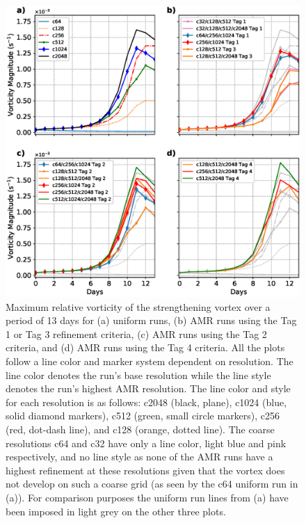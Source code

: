 \begin{figure}
   \centerline{%
   \noindent
   \includegraphics[width=\textwidth]{Chap2/vortmax_lineplot.eps}}
   \caption{Maximum relative vorticity of the strengthening vortex over a 
   period of 13 days for (a) uniform runs, (b) AMR runs using the Tag 1 or
   Tag 3 refinement criteria, (c) AMR runs using the Tag 2 criteria, and (d)
   AMR runs using the Tag 4 criteria. All the plots follow a line color and marker
   system dependent on resolution. The line color denotes the run's base resolution
   while the line style denotes the run's highest AMR resolution. The line color and
   style for each resolution is as follows: c2048 (black, plane), c1024 (blue, solid diamond markers),
   c512 (green, small circle markers), c256 (red, dot-dash line), and c128 (orange, dotted line).
   The coarse resolutions c64 and c32 have only a line color, light blue and pink respectively, and
   no line style as none of the AMR runs have a highest refinement at these resolutions given that
   the vortex does not develop on such a coarse grid (as seen by the c64 uniform run in (a)).
   For comparison purposes the uniform run lines from (a) have been imposed in light grey on
   the other three plots.
   }
   \label{fig:vort_lineplot}
\end{figure}

